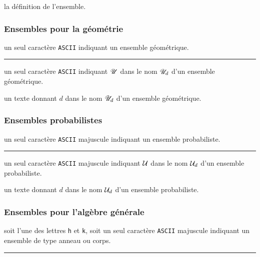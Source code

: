 \documentclass[12pt,a4paper]{article}
\theoremstyle{definition}
\newcommand\separation{
	\medskip
	\hfill\rule{0.5\textwidth}{0.75pt}\hfill
	\medskip
}
\newcommand\ascii{\texttt{ASCII}}
\begin{document}
\IDarg{} la définition de l'ensemble.





\subsubsection{Ensembles pour la géométrie}


\IDarg{} un seul caractère \ascii{} indiquant un ensemble géométrique.


\separation



 un seul caractère \ascii{} indiquant $\setgeo{U}$ dans le nom $\setgeo*{U}{d}$ d'un ensemble géométrique.

 un texte donnant $d$ dans le nom $\setgeo*{U}{d}$ d'un ensemble géométrique.





\subsubsection{Ensembles probabilistes}


\IDarg{} un seul caractère \ascii{} majuscule indiquant un ensemble probabiliste.


\separation



 un seul caractère \ascii{} majuscule indiquant $\setproba{U}$ dans le nom $\setproba*{U}{d}$ d'un ensemble probabiliste.

 un texte donnant $d$ dans le nom $\setproba*{U}{d}$ d'un ensemble probabiliste.





\subsubsection{Ensembles pour l'algèbre générale}


\IDarg{} soit l'une des lettres  \texttt{h} et \texttt{k}, soit un seul caractère \ascii{} majuscule indiquant un ensemble de type anneau ou corps.


\separation
\end{document}
